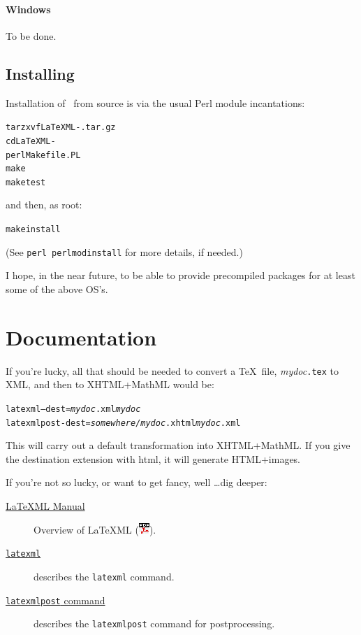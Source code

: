 \documentclass{article}
\newcommand{\PDFIcon}{\includegraphics{pdf}}
\begin{document}
\paragraph{Windows}
To be done.

\subsection{Installing}
Installation of \LaTeXML\ from source is via the usual Perl module incantations:
\begin{alltt}
   tar zxvf LaTeXML-\CurrentVersion.tar.gz
   cd LaTeXML-\CurrentVersion\\
   perl Makefile.PL
   make
   make test
\end{alltt}
and then, as root:
\begin{alltt}
   make install
\end{alltt}
(See \texttt{perl perlmodinstall} for more details, if needed.)

I hope, in the near future, to be able to provide precompiled packages
for at least some of the above OS's.

\section{Documentation}\label{docs}
If you're lucky, all that should be needed to convert
a \TeX\ file, \textit{mydoc}\texttt{.tex} to XML, and
then to XHTML+MathML would be:
\begin{alltt}
   latexml --dest=\textit{mydoc}.xml \textit{mydoc}
   latexmlpost -dest=\textit{somewhere/mydoc}.xhtml \textit{mydoc}.xml
\end{alltt}
This will carry out a default transformation into XHTML+MathML.  If you
give the destination extension with html, it will generate HTML+images.

If you're not so lucky, or want to get fancy, well \ldots dig deeper:
\begin{description}
\item[\href{manual/index.xhtml}{LaTeXML Manual}]
    Overview of LaTeXML (\href{manual.pdf}{\PDFIcon}).
\item[\href{manual/commands/latexml.xhtml}{\texttt{latexml}}]
    describes the \texttt{latexml} command.
\item[\href{manual/commands/latexmlpost.xhtml}{\texttt{latexmlpost} command}]
   describes the \texttt{latexmlpost} command for postprocessing.
\end{description}
\end{document}
